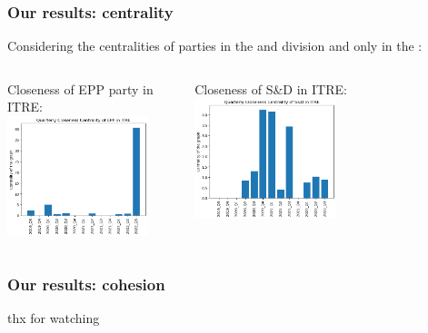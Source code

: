 \documentclass{beamer}
\begin{document}
\begin{frame}
\frametitle{Our results: centrality}
	
	Considering the  centralities of parties in the  and  division and only in the :
	\vspace{4mm}
	\pause
	
	\begin{columns}
	\column{5cm}
	Closeness of EPP party in ITRE:
	\\
	\includegraphics[height=3.5cm]{img/EPP_ITRE_Q_closeness.png}

	\pause \column{5cm}
	Closeness of S\&D in ITRE:
	\includegraphics[height=3.5cm]{img/S&D_ITRE_Q_closeness.png}
	
	\end{columns}

\end{frame}

\begin{frame}
\frametitle{Our results: cohesion}
\end{frame}



\begin{frame}{}
	
	thx for watching
	
\end{frame}
\end{document}
